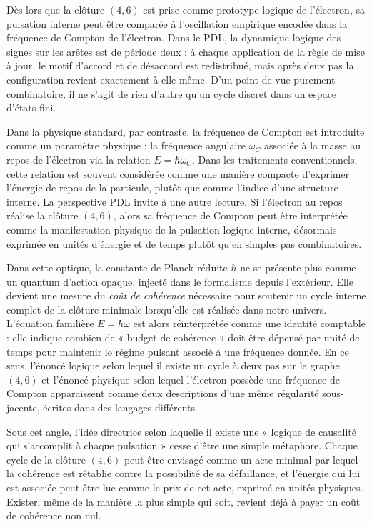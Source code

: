 \documentclass[11pt,a4paper]{article}
\theoremstyle{definition}
\begin{document}
Dès lors que la clôture \((4,6)\) est prise comme prototype logique de l’électron, sa pulsation interne peut être comparée à l’oscillation empirique encodée dans la fréquence de Compton de l’électron.\cite{Laubscher_EmergencePhysicalReality_2024,Laubscher_Schrodinger_Compat_v2_2024} Dans le PDL, la dynamique logique des signes sur les arêtes est de période deux : à chaque application de la règle de mise à jour, le motif d’accord et de désaccord est redistribué, mais après deux pas la configuration revient exactement à elle-même.\cite{Laubscher_MinimalClosures_46_2024} D’un point de vue purement combinatoire, il ne s’agit de rien d’autre qu’un cycle discret dans un espace d’états fini.

Dans la physique standard, par contraste, la fréquence de Compton est introduite comme un paramètre physique : la fréquence angulaire \(\omega_C\) associée à la masse au repos de l’électron via la relation \(E = \hbar \omega_C\). Dans les traitements conventionnels, cette relation est souvent considérée comme une manière compacte d’exprimer l’énergie de repos de la particule, plutôt que comme l’indice d’une structure interne. La perspective PDL invite à une autre lecture. Si l’électron au repos réalise la clôture \((4,6)\), alors sa fréquence de Compton peut être interprétée comme la manifestation physique de la pulsation logique interne, désormais exprimée en unités d’énergie et de temps plutôt qu’en simples pas combinatoires.\cite{Laubscher_EmergencePhysicalReality_2024,Laubscher_Existence_PulsatingClosure_2026}

Dans cette optique, la constante de Planck réduite \(\hbar\) ne se présente plus comme un quantum d’action opaque, injecté dans le formalisme depuis l’extérieur. Elle devient une mesure du \emph{coût de cohérence} nécessaire pour soutenir un cycle interne complet de la clôture minimale lorsqu’elle est réalisée dans notre univers.\cite{Laubscher_EmergencePhysicalReality_2024,Laubscher_PDL_Position_2024} L’équation familière \(E = \hbar \omega\) est alors réinterprétée comme une identité comptable : elle indique combien de « budget de cohérence » doit être dépensé par unité de temps pour maintenir le régime pulsant associé à une fréquence donnée. En ce sens, l’énoncé logique selon lequel il existe un cycle à deux pas sur le graphe \((4,6)\) et l’énoncé physique selon lequel l’électron possède une fréquence de Compton apparaissent comme deux descriptions d’une même régularité sous-jacente, écrites dans des langages différents.

Sous cet angle, l’idée directrice selon laquelle il existe une « logique de causalité qui s’accomplit à chaque pulsation » cesse d’être une simple métaphore. Chaque cycle de la clôture \((4,6)\) peut être envisagé comme un acte minimal par lequel la cohérence est rétablie contre la possibilité de sa défaillance, et l’énergie qui lui est associée peut être lue comme le prix de cet acte, exprimé en unités physiques.\cite{Laubscher_Existence_PulsatingClosure_2026} Exister, même de la manière la plus simple qui soit, revient déjà à payer un coût de cohérence non nul.
\end{document}
